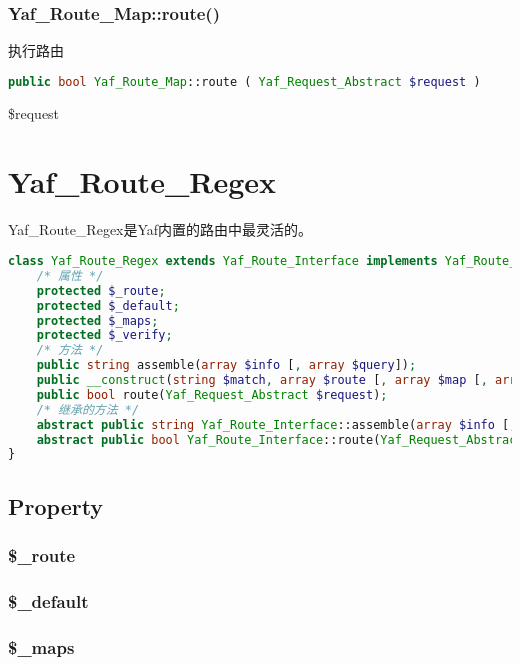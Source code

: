 \subsection{Yaf\_Route\_Map::route()}

执行路由

\begin{lstlisting}[language=PHP]
public bool Yaf_Route_Map::route ( Yaf_Request_Abstract $request )
\end{lstlisting}

\begin{compactitem}
\item \$request
\end{compactitem}

\chapter{Yaf\_Route\_Regex}

Yaf\_Route\_Regex是Yaf内置的路由中最灵活的。


\begin{lstlisting}[language=PHP]
class Yaf_Route_Regex extends Yaf_Route_Interface implements Yaf_Route_Interface {
    /* 属性 */
    protected $_route;
    protected $_default;
    protected $_maps;
    protected $_verify;
    /* 方法 */
    public string assemble(array $info [, array $query]);
    public __construct(string $match, array $route [, array $map [, array $verify]]);
    public bool route(Yaf_Request_Abstract $request);
    /* 继承的方法 */
    abstract public string Yaf_Route_Interface::assemble(array $info [, array $query]);
    abstract public bool Yaf_Route_Interface::route(Yaf_Request_Abstract $request);
}
\end{lstlisting}

\section{Property}


\subsection{\$\_route}


\subsection{\$\_default}


\subsection{\$\_maps}


